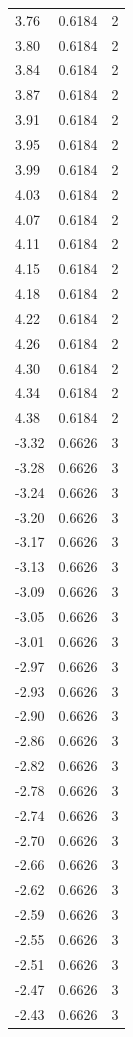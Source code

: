 \begin{longtable}{lrr}
  3.76 & 0.6184 & 2 \\
  3.80 & 0.6184 & 2 \\
  3.84 & 0.6184 & 2 \\
  3.87 & 0.6184 & 2 \\
  3.91 & 0.6184 & 2 \\
  3.95 & 0.6184 & 2 \\
  3.99 & 0.6184 & 2 \\
  4.03 & 0.6184 & 2 \\
  4.07 & 0.6184 & 2 \\
  4.11 & 0.6184 & 2 \\
  4.15 & 0.6184 & 2 \\
  4.18 & 0.6184 & 2 \\
  4.22 & 0.6184 & 2 \\
  4.26 & 0.6184 & 2 \\
  4.30 & 0.6184 & 2 \\
  4.34 & 0.6184 & 2 \\
  4.38 & 0.6184 & 2 \\
  -3.32 & 0.6626 & 3 \\
  -3.28 & 0.6626 & 3 \\
  -3.24 & 0.6626 & 3 \\
  -3.20 & 0.6626 & 3 \\
  -3.17 & 0.6626 & 3 \\
  -3.13 & 0.6626 & 3 \\
  -3.09 & 0.6626 & 3 \\
  -3.05 & 0.6626 & 3 \\
  -3.01 & 0.6626 & 3 \\
  -2.97 & 0.6626 & 3 \\
  -2.93 & 0.6626 & 3 \\
  -2.90 & 0.6626 & 3 \\
  -2.86 & 0.6626 & 3 \\
  -2.82 & 0.6626 & 3 \\
  -2.78 & 0.6626 & 3 \\
  -2.74 & 0.6626 & 3 \\
  -2.70 & 0.6626 & 3 \\
  -2.66 & 0.6626 & 3 \\
  -2.62 & 0.6626 & 3 \\
  -2.59 & 0.6626 & 3 \\
  -2.55 & 0.6626 & 3 \\
  -2.51 & 0.6626 & 3 \\
  -2.47 & 0.6626 & 3 \\
  -2.43 & 0.6626 & 3 \\

\end{longtable}
